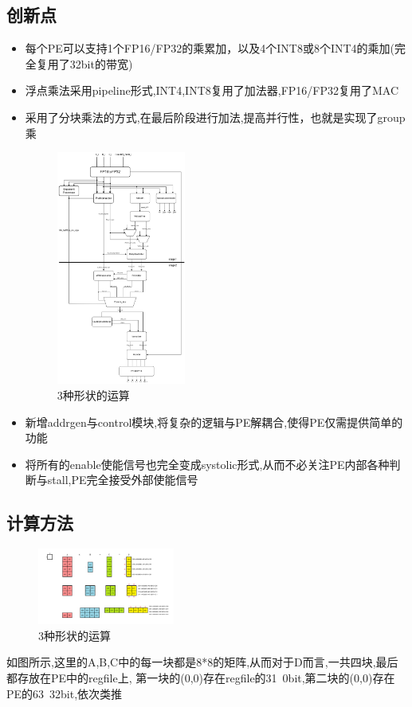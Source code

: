 \documentclass[zihao=-4, UTF8]{ctexart}
\begin{document}
\subsection{创新点}
\begin{itemize}
  \item 每个PE可以支持1个FP16/FP32的乘累加，以及4个INT8或8个INT4的乘加(完全复用了32bit的带宽)
  \item 浮点乘法采用pipeline形式,INT4,INT8复用了加法器,FP16/FP32复用了MAC
  \item 采用了分块乘法的方式,在最后阶段进行加法,提高并行性，也就是实现了group乘
  \begin{figure}[H]
      \centering
      \includegraphics[width=0.4\textwidth]{FP.png}
      \caption{3种形状的运算}
      \label{fig:FP16/FP32}
    \end{figure}
  \item 新增addrgen与control模块,将复杂的逻辑与PE解耦合,使得PE仅需提供简单的功能
  \item 将所有的enable使能信号也完全变成systolic形式,从而不必关注PE内部各种判断与stall,PE完全接受外部使能信号
\end{itemize}

\subsection{计算方法}
\begin{figure}[H]
      \centering
      \includegraphics[width=0.4\textwidth]{计算.png}
      \caption{3种形状的运算}
      \label{fig:compute}
    \end{figure}
如图所示,这里的A,B,C中的每一块都是8*8的矩阵,从而对于D而言,一共四块,最后都存放在PE中的regfile上,
第一块的(0,0)存在regfile的31~0bit,第二块的(0,0)存在PE的63~32bit,依次类推
\end{document}

